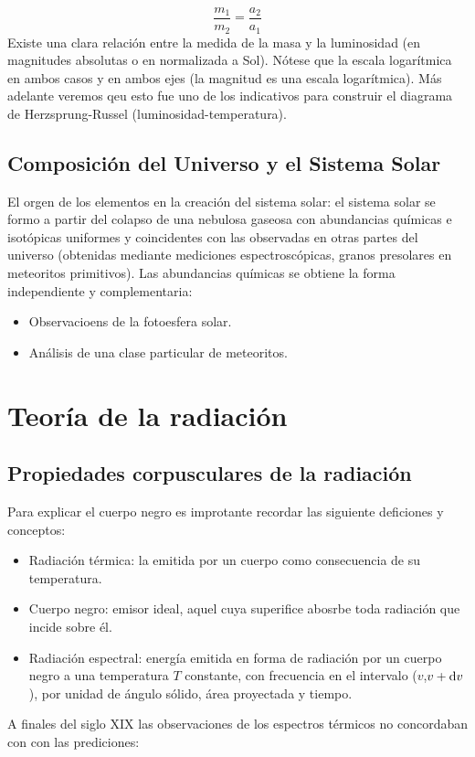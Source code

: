 \begin{equation*}
    \frac{m_1}{m_2} = \frac{a_2}{a_1}
\end{equation*}
Existe una clara relación entre la medida de la masa y la luminosidad (en magnitudes absolutas o en normalizada a Sol). Nótese que la escala logarítmica en ambos casos y en ambos ejes (la magnitud es una escala logarítmica). Más adelante veremos qeu esto fue uno de los indicativos para construir el diagrama de Herzsprung-Russel (luminosidad-temperatura).

\subsection{Composición del Universo y el Sistema Solar}

El orgen de los elementos en la creación del sistema solar: el sistema solar se formo a partir del colapso de una nebulosa gaseosa con abundancias químicas e isotópicas uniformes y coincidentes con las observadas en otras partes del universo (obtenidas mediante mediciones espectroscópicas, granos presolares en meteoritos primitivos). Las abundancias químicas se obtiene la forma independiente y complementaria:

\begin{itemize}
    \item Observacioens de la fotoesfera solar.
    \item Análisis de una clase particular de meteoritos.
\end{itemize}





\section{Teoría de la radiación}

\subsection{Propiedades corpusculares de la radiación}

Para explicar el cuerpo negro es improtante recordar las siguiente deficiones y conceptos: 

\begin{itemize}
    \item Radiación térmica: la emitida por un cuerpo como consecuencia de su temperatura.
    \item Cuerpo negro: emisor ideal, aquel cuya superifice abosrbe toda radiación que incide sobre él.
    \item Radiación espectral: energía emitida en forma de radiación por un cuerpo negro a una temperatura $T$ constante, con frecuencia en el intervalo ($v$,$v+\mathrm{d} v$), por unidad de ángulo sólido, área proyectada y tiempo. 
\end{itemize}
A finales del siglo XIX las observaciones de los espectros térmicos no concordaban con con las prediciones:

